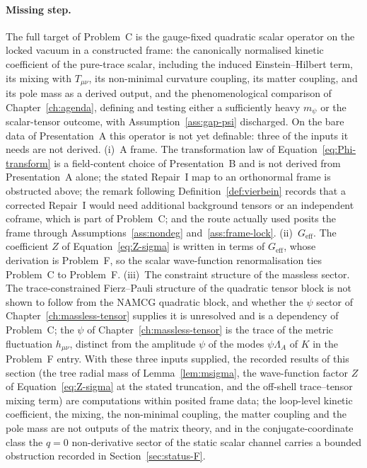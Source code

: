 \paragraph{Missing step.} The full target of Problem~C is the gauge-fixed quadratic scalar operator on the locked vacuum in a constructed frame: the canonically normalised kinetic coefficient of the pure-trace scalar, including the induced Einstein--Hilbert term, its mixing with \(T_{\mu\nu}\), its non-minimal curvature coupling, its matter coupling, and its pole mass as a derived output, and the phenomenological comparison of Chapter~\ref{ch:agenda}, defining and testing either a sufficiently heavy \(m_\psi\) or the scalar-tensor outcome, with Assumption~\ref{ass:gap-psi} discharged. On the bare data of Presentation~A this operator is not yet definable: three of the inputs it needs are not derived. (i)~A frame. The transformation law of Equation~\eqref{eq:Phi-transform} is a field-content choice of Presentation~B and is not derived from Presentation~A alone; the stated Repair~I map to an orthonormal frame is obstructed above; the remark following Definition~\ref{def:vierbein} records that a corrected Repair~I would need additional background tensors or an independent coframe, which is part of Problem~C; and the route actually used posits the frame through Assumptions~\ref{ass:nondeg} and~\ref{ass:frame-lock}. (ii)~\(G_{\mathrm{eff}}\). The coefficient \(Z\) of Equation~\eqref{eq:Z-sigma} is written in terms of \(G_{\mathrm{eff}}\), whose derivation is Problem~F, so the scalar wave-function renormalisation ties Problem~C to Problem~F. (iii)~The constraint structure of the massless sector. The trace-constrained Fierz--Pauli structure of the quadratic tensor block is not shown to follow from the NAMCG quadratic block, and whether the \(\psi\) sector of Chapter~\ref{ch:massless-tensor} supplies it is unresolved and is a dependency of Problem~C; the \(\psi\) of Chapter~\ref{ch:massless-tensor} is the trace of the metric fluctuation \(h_{\mu\nu}\), distinct from the amplitude \(\psi\) of the modes \(\psi\Lambda_A\) of \(K\) in the Problem~F entry. With these three inputs supplied, the recorded results of this section (the tree radial mass of Lemma~\ref{lem:msigma}, the wave-function factor \(Z\) of Equation~\eqref{eq:Z-sigma} at the stated truncation, and the off-shell trace--tensor mixing term) are computations within posited frame data; the loop-level kinetic coefficient, the mixing, the non-minimal coupling, the matter coupling and the pole mass are not outputs of the matrix theory, and in the conjugate-coordinate class the \(q=0\) non-derivative sector of the static scalar channel carries a bounded obstruction recorded in Section~\ref{sec:status-F}.